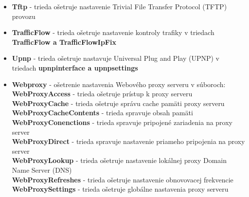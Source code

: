 \begin{itemize}
\item \textbf{Tftp} - trieda ošetruje nastavenie Trivial File Transfer Protocol (TFTP) provozu
\item \textbf{TrafficFlow} - trieda ošetruje nastavenie kontroly trafiky v triedach \textbf{TrafficFlow a TrafficFlowIpFix}
\item \textbf{Upnp} - trieda ošetruje nastavuje Universal Plug and Play (UPNP) v triedach \textbf{upnpinterface a upnpsettings} 
\item \textbf{Webproxy} - ošetrenie nastavenia Webového proxy serveru v súboroch:\\
\textbf{WebProxyAccess} - trieda ošetruje prístup k proxy serveru\\
\textbf{WebProxyCache} - trieda ošetruje správu cache pamäti proxy serveru\\
\textbf{WebProxyCacheContents} - trieda spravuje obsah pamäti\\
\textbf{WebProxyConenctions} - trieda spravuje pripojené zariadenia na proxy server\\
\textbf{WebProxyDirect} - trieda spravuje nastavenie priameho pripojenia na proxy server\\
\textbf{WebProxyLookup} - trieda ošetruje nastavenie lokálnej proxy Domain Name Server (DNS)\\
\textbf{WebProxyRefreshes} - trieda ošetruje nastavenie obnovovacej frekvencie\\
\textbf{WebProxySettings} - trieda ošetruje globálne nastavenia proxy serveru
\end{itemize}
